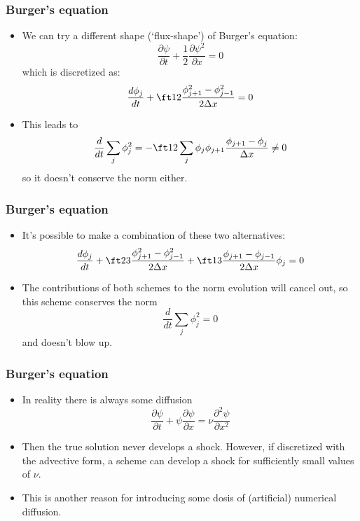 \documentclass[aspectratio=43,9pt]{beamer}
\begin{document}
\begin{frame}
	\frametitle{Burger's equation}
	\begin{itemize}
		\item We can try a different shape (`flux-shape') of Burger's equation:
			\begin{equation*}
				\frac{\partial \psi}{\partial t} + \frac{1}{2} \frac{\partial \psi^2}{\partial x} = 0
			\end{equation*}
			which is discretized as:
			\begin{equation*}
				\frac{d \phi_j}{dt}  + \ft12 \frac{\phi_{j+1}^2 - \phi_{j-1}^2}{2 \Delta x} = 0
			\end{equation*}
		\item This leads to
			\begin{equation*}
				\frac{d}{dt} \sum_j \phi_j^2 =-\ft12	\sum_j \phi_j \phi_{j+1}\frac{\phi_{j+1} - \phi_j}{\Delta x}	\ne 0
			\end{equation*}
			so it doesn't conserve the norm either.
	\end{itemize}
\end{frame}
%
%
\begin{frame}
	\frametitle{Burger's equation}
	\begin{itemize}
		\item It's possible to make a combination of these two alternatives:
			\begin{equation*}
				\frac{d \phi_j}{dt}  + \ft23 \frac{\phi_{j+1}^2 - \phi_{j-1}^2}{2 \Delta x}  +\ft13 \frac{\phi_{j+1} - \phi_{j-1}}{2 \Delta x} \phi_j = 0
			\end{equation*}
		\item The contributions of both schemes to the norm evolution will cancel out, so this scheme conserves the norm
			\begin{equation*}
				\frac{d}{dt} \sum_j \phi_j^2 = 0
			\end{equation*}
			and doesn't blow up.
	\end{itemize}
\end{frame}
%
%
\begin{frame}
	\frametitle{Burger's equation}
	\begin{itemize}
		\item In reality there is always some diffusion
			\begin{equation*}
				\frac{\partial \psi}{\partial t} + \psi \frac{\partial \psi}{\partial x} = \nu \frac{\partial^2 \psi}{\partial x^2}
			\end{equation*}\vspace*{2ex}
		\item Then the true solution never develops a shock. However, if discretized with the advective form, a scheme can develop a shock for sufficiently small values of $\nu$.\vspace*{2ex}
		\item This is another reason for introducing some dosis of (artificial) numerical diffusion.
	\end{itemize}
\end{frame}
\end{document}
